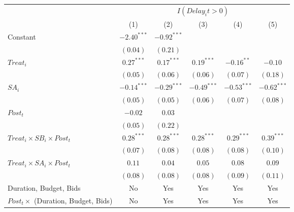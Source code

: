 \documentclass[
]{article}
\begin{document}
\begin{table}
\begin{center}
\begin{tabular}{l c c c c c}
\hline
 & \multicolumn{5}{c}{$I(Delay_it>0)$} \\
\cline{2-6}
 & (1) & (2) & (3) & (4) & (5) \\
\hline
Constant                                   & $-2.40^{***}$ & $-0.92^{***}$ &               &               &               \\
                                           & $(0.04)$      & $(0.21)$      &               &               &               \\
$Treat_i$                                  & $0.27^{***}$  & $0.17^{***}$  & $0.19^{***}$  & $-0.16^{**}$  & $-0.10$       \\
                                           & $(0.05)$      & $(0.06)$      & $(0.06)$      & $(0.07)$      & $(0.18)$      \\
$SA_i$                                     & $-0.14^{***}$ & $-0.29^{***}$ & $-0.49^{***}$ & $-0.53^{***}$ & $-0.62^{***}$ \\
                                           & $(0.05)$      & $(0.05)$      & $(0.06)$      & $(0.07)$      & $(0.08)$      \\
$Post_t$                                   & $-0.02$       & $0.03$        &               &               &               \\
                                           & $(0.05)$      & $(0.22)$      &               &               &               \\
$Treat_i \times SB_i \times Post_t$        & $0.28^{***}$  & $0.28^{***}$  & $0.28^{***}$  & $0.29^{***}$  & $0.39^{***}$  \\
                                           & $(0.07)$      & $(0.08)$      & $(0.08)$      & $(0.08)$      & $(0.10)$      \\
$Treat_i \times SA_i \times Post_t$        & $0.11$        & $0.04$        & $0.05$        & $0.08$        & $0.09$        \\
                                           & $(0.08)$      & $(0.08)$      & $(0.08)$      & $(0.09)$      & $(0.11)$      \\
\hline
Duration, Budget, Bids                     & No            & Yes           & Yes           & Yes           & Yes           \\
$Post_t \times $  (Duration, Budget, Bids) & No            & Yes           & Yes           & Yes           & Yes           \\

\end{tabular}
\end{center}
\end{table}
\end{document}
